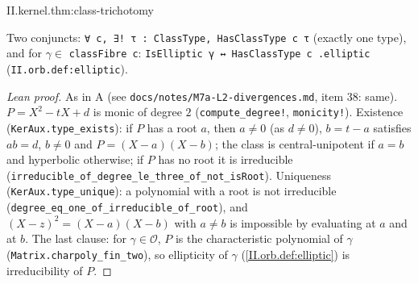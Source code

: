 \begin{theorem}[trichotomy]
\end{theorem}
\begin{tfformal}{II.kernel.thm:class-trichotomy}
\begin{tffidelity}
Two conjuncts: \texttt{∀ c, ∃! τ : ClassType, HasClassType c τ} (exactly one type), and for $\gamma\in$ \texttt{classFibre c}: \texttt{IsElliptic γ ↔ HasClassType c .elliptic} (\texttt{II.orb.def:elliptic}).
\end{tffidelity}
\end{tfformal}
\begin{proof}[Lean proof]
As in A (see \texttt{docs/notes/M7a-L2-divergences.md}, item 38: same). $P=X^2-tX+d$ is monic of degree $2$ (\texttt{compute\_degree!}, \texttt{monicity!}). Existence (\texttt{KerAux.type\_exists}): if $P$ has a root $a$, then $a\ne0$ (as $d\ne0$), $b=t-a$ satisfies $ab=d$, $b\ne0$ and $P=(X-a)(X-b)$; the class is central-unipotent if $a=b$ and hyperbolic otherwise; if $P$ has no root it is irreducible (\texttt{irreducible\_of\_degree\_le\_three\_of\_not\_isRoot}). Uniqueness (\texttt{KerAux.type\_unique}): a polynomial with a root is not irreducible (\texttt{degree\_eq\_one\_of\_irreducible\_of\_root}), and $(X-z)^2=(X-a)(X-b)$ with $a\ne b$ is impossible by evaluating at $a$ and at $b$. The last clause: for $\gamma\in\mathcal O$, $P$ is the characteristic polynomial of $\gamma$ (\texttt{Matrix.charpoly\_fin\_two}), so ellipticity of $\gamma$ (\cref{II.orb.def:elliptic}) is irreducibility of $P$.
\end{proof}

